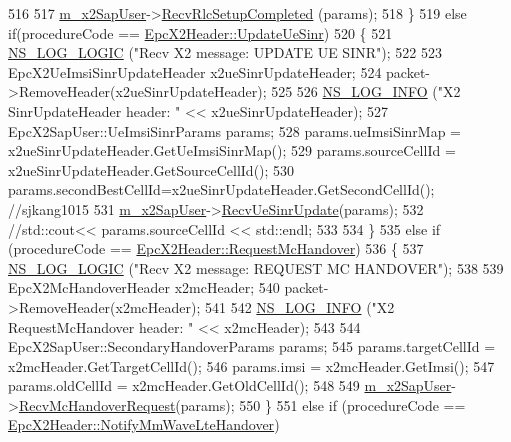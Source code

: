 \begin{DoxyCode}
516 
517       \hyperlink{classns3_1_1EpcX2_a0a74a3c19067fe18af3021c7b4c24c19}{m\_x2SapUser}->\hyperlink{classns3_1_1EpcX2SapUser_a6aea3dfa4b9483ef32463a0564eaa098}{RecvRlcSetupCompleted} (params);
518     \}
519   \textcolor{keywordflow}{else} \textcolor{keywordflow}{if}(procedureCode == \hyperlink{classns3_1_1EpcX2Header_afd178c1ed3c47948c587955698a15b0da031eb5cb9e5a3611fbf6476448d6549f}{EpcX2Header::UpdateUeSinr})
520     \{
521       \hyperlink{group__logging_ga88acd260151caf2db9c0fc84997f45ce}{NS\_LOG\_LOGIC} (\textcolor{stringliteral}{"Recv X2 message: UPDATE UE SINR"});
522       
523       EpcX2UeImsiSinrUpdateHeader x2ueSinrUpdateHeader;
524       packet->RemoveHeader(x2ueSinrUpdateHeader);
525 
526       \hyperlink{group__logging_gafbd73ee2cf9f26b319f49086d8e860fb}{NS\_LOG\_INFO} (\textcolor{stringliteral}{"X2 SinrUpdateHeader header: "} << x2ueSinrUpdateHeader);
527       EpcX2SapUser::UeImsiSinrParams params;
528       params.ueImsiSinrMap = x2ueSinrUpdateHeader.GetUeImsiSinrMap();
529       params.sourceCellId = x2ueSinrUpdateHeader.GetSourceCellId();
530       params.secondBestCellId=x2ueSinrUpdateHeader.GetSecondCellId(); \textcolor{comment}{//sjkang1015}
531       \hyperlink{classns3_1_1EpcX2_a0a74a3c19067fe18af3021c7b4c24c19}{m\_x2SapUser}->\hyperlink{classns3_1_1EpcX2SapUser_ab14ff4814fc40ca604d03654ab310a44}{RecvUeSinrUpdate}(params);  
532       \textcolor{comment}{//std::cout<< params.sourceCellId << std::endl;}
533 
534     \}
535   \textcolor{keywordflow}{else} \textcolor{keywordflow}{if} (procedureCode == \hyperlink{classns3_1_1EpcX2Header_afd178c1ed3c47948c587955698a15b0da10ebb8c46efe10d8f9bacbd89027d945}{EpcX2Header::RequestMcHandover})
536     \{
537       \hyperlink{group__logging_ga88acd260151caf2db9c0fc84997f45ce}{NS\_LOG\_LOGIC} (\textcolor{stringliteral}{"Recv X2 message: REQUEST MC HANDOVER"});
538       
539       EpcX2McHandoverHeader x2mcHeader;
540       packet->RemoveHeader(x2mcHeader);
541 
542       \hyperlink{group__logging_gafbd73ee2cf9f26b319f49086d8e860fb}{NS\_LOG\_INFO} (\textcolor{stringliteral}{"X2 RequestMcHandover header: "} << x2mcHeader);
543 
544       EpcX2SapUser::SecondaryHandoverParams params;
545       params.targetCellId = x2mcHeader.GetTargetCellId();
546       params.imsi = x2mcHeader.GetImsi();
547       params.oldCellId = x2mcHeader.GetOldCellId();
548 
549       \hyperlink{classns3_1_1EpcX2_a0a74a3c19067fe18af3021c7b4c24c19}{m\_x2SapUser}->\hyperlink{classns3_1_1EpcX2SapUser_a7eecce34706ef7c77ccdc9623822ce33}{RecvMcHandoverRequest}(params);  
550     \}
551   \textcolor{keywordflow}{else} \textcolor{keywordflow}{if} (procedureCode == \hyperlink{classns3_1_1EpcX2Header_afd178c1ed3c47948c587955698a15b0dacda8cb8a58dac96f5ea9be813f3a42c0}{EpcX2Header::NotifyMmWaveLteHandover})

\end{DoxyCode}
